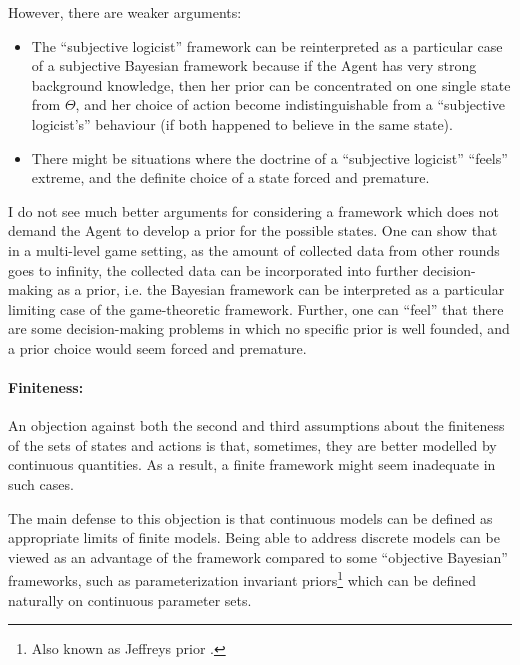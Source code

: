 \documentclass{article}
\begin{document}
However, there are weaker arguments:
\begin{itemize}
    \item The ``subjective logicist'' framework can be reinterpreted as a particular case of a subjective Bayesian framework because if the Agent has very strong background knowledge, then her prior can be concentrated on one single state from $\Theta$, and her choice of action become indistinguishable from a ``subjective logicist's'' behaviour (if both happened to believe in the same state).
    \item There might be situations where the doctrine of a ``subjective logicist'' ``feels'' extreme, and the definite choice of a state forced and premature.
\end{itemize}

I do not see much better arguments for considering a framework which does not demand the Agent to develop a prior for the possible states. One can show that in a multi-level game setting, as the amount of collected data from other rounds goes to infinity, the collected data can be incorporated into further decision-making as a prior, i.e. the Bayesian framework can be interpreted as a particular limiting case of the game-theoretic framework. Further, one can ``feel'' that there are some decision-making problems in which no specific prior is well founded, and a prior choice would seem forced and premature.

\paragraph{Finiteness:}
An objection against both the second and third assumptions about the finiteness of the sets of states and actions is that, sometimes, they are better modelled by continuous quantities. As a result, a finite framework might seem inadequate in such cases.

The main defense to this objection is that continuous models can be defined as appropriate limits of finite models. Being able to address discrete models can be viewed as an advantage of the framework compared to some ``objective Bayesian'' frameworks, such as parameterization invariant priors\footnote{Also known as Jeffreys prior \cite{book:Jaynes,paper:JeffreysPriorOriginal}.} which can be defined naturally on continuous parameter sets.
\end{document}
